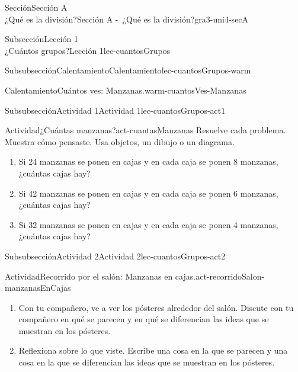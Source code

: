 \begin{sectionptx}{Sección}{{\Large Sección A\\}¿Qué es la división?}{}{Sección A -~¿Qué es la división?}{}{}{gra3-uni4-secA}
\begin{subsectionptx}{Subsección}{{\normalsize Lección 1\\[-0.05cm]}¿Cuántos grupos?}{}{Lección 1}{}{}{lec-cuantosGrupos}
\begin{subsubsectionptx}{Subsubsección}{Calentamiento}{}{Calentamiento}{}{}{lec-cuantosGrupos-warm}
\begin{exploration}{Calentamiento}{Cuántos ves: Manzanas.}{warm-cuantosVes-Manzanas}
\begin{sidebyside}{2}{0}{0}{0.2}
\end{sidebyside}
\end{exploration}%
\end{subsubsectionptx}
%
%
\typeout{************************************************}
\typeout{************************************************}
%
\begin{subsubsectionptx}{Subsubsección}{Actividad 1}{}{Actividad 1}{}{}{lec-cuantosGrupos-act1}
\begin{activity}{Actividad}{¿Cuántas manzanas?}{act-cuantasManzanas}%
Resuelve cada problema. Muestra cómo pensaste. Usa objetos, un dibujo o un diagrama.%
\par
%
\begin{enumerate}
\item{}Si 24 manzanas se ponen en cajas y en cada caja se ponen 8 manzanas, ¿cuántas cajas hay?%
\item{}Si 42 manzanas se ponen en cajas y en cada caja se ponen 6 manzanas, ¿cuántas cajas hay?%
\item{}Si 32 manzanas se ponen en cajas y en cada caja se ponen 4 manzanas, ¿cuántas cajas hay?%
\end{enumerate}
%
\end{activity}%
\end{subsubsectionptx}
%
%
\typeout{************************************************}
\typeout{************************************************}
%
\begin{subsubsectionptx}{Subsubsección}{Actividad 2}{}{Actividad 2}{}{}{lec-cuantosGrupos-act2}
\begin{activity}{Actividad}{Recorrido por el salón: Manzanas en cajas.}{act-recorridoSalon-manzanasEnCajas}%
%
\begin{enumerate}
\item{}Con tu compañero, ve a ver los pósteres alrededor del salón. Discute con tu compañero en qué se parecen y en qué se diferencian las ideas que se muestran en los pósteres.%
\item{}Reflexiona sobre lo que viste. Escribe una cosa en la que se parecen y una cosa en la que se diferencian las ideas que se muestran en los pósteres.%
\end{enumerate}
%
\end{activity}%
\end{subsubsectionptx}
%

\end{subsectionptx}
\end{sectionptx}
